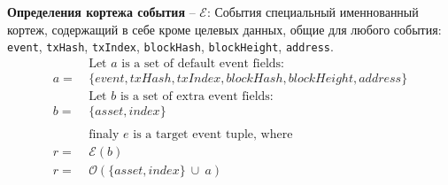 \documentclass[12pt]{report}
\def\code#1{\colorbox{light-gray}{\texttt{#1}}}
\begin{document}
\textbf{Определения кортежа события} – $\mathcal{E}$:\hfill\null\linebreak
События специальный именнованный кортеж, содержащий в себе кроме целевых данных, общие для любого события: \code{event}, \code{txHash}, \code{txIndex}, \code{blockHash}, \code{blockHeight}, \code{address}.
\begin{align}
&\ \text{Let } a \text{ is a set of default event fields: } \nonumber\\
a =&\ \{event, txHash, txIndex, blockHash, blockHeight, address\} \nonumber\\
&\ \text{Let } b \text{ is a set of extra event fields: } \nonumber\\
b =&\ \{asset, index\} \nonumber\\
&\ \nonumber\\
&\ \text{finaly } e \text{ is a target event tuple, where} \nonumber\\
r =&\ \mathcal{E}(b) \\
r =&\ \mathcal{O}(\{asset, index\} \ \cup \ a)
\end{align}

\pagebreak
\end{document}
